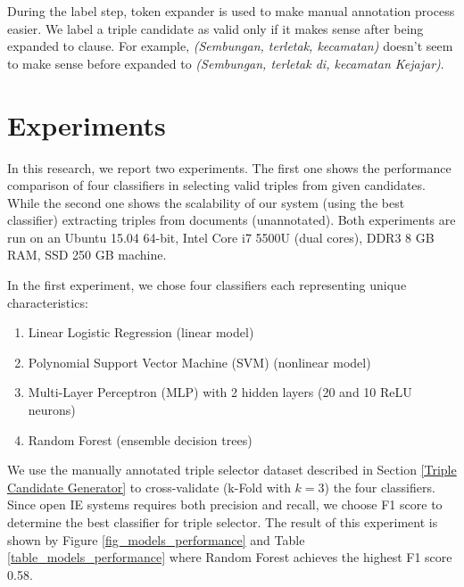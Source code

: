 \documentclass[conference,compsoc,12pt]{IEEEtran}
\begin{document}
During the label step, token expander is used to make manual annotation process easier. We label a triple candidate as valid only if it makes sense after being expanded to clause. For example, \textit{(Sembungan, terletak, kecamatan)} doesn't seem to make sense before expanded to \textit{(Sembungan, terletak di, kecamatan Kejajar)}.

\section{Experiments} \label{Experiments}

In this research, we report two experiments. The first one shows the performance comparison of four classifiers in selecting valid triples from given candidates. While the second one shows the scalability of our system (using the best classifier) extracting triples from documents (unannotated). Both experiments are run on an Ubuntu 15.04 64-bit, Intel Core i7 5500U (dual cores), DDR3 8 GB RAM, SSD 250 GB machine.

In the first experiment, we chose four classifiers each representing unique characteristics: 

\begin{enumerate}
\item Linear Logistic Regression\cite{fan2008liblinear} (linear model)
\item Polynomial Support Vector Machine (SVM)\cite{chang2011libsvm} (nonlinear model)
\item Multi-Layer Perceptron (MLP)\cite{hinton1989connectionist} with 2 hidden layers (20 and 10 ReLU\cite{nair2010rectified} neurons)
\item Random Forest\cite{wasserman2015grid} (ensemble decision trees)
\end{enumerate}
  
We use the manually annotated triple selector dataset described in Section \ref{Triple Candidate Generator} to cross-validate\cite{kohavi1995study} (k-Fold with $k=3$) the four classifiers. Since open IE systems requires both precision and recall\cite{angeli2015leveraging}, we choose F1 score to determine the best classifier for triple selector. The result of this experiment is shown by Figure \ref{fig_models_performance} and Table \ref{table_models_performance} where Random Forest achieves the highest F1 score 0.58.
\end{document}
